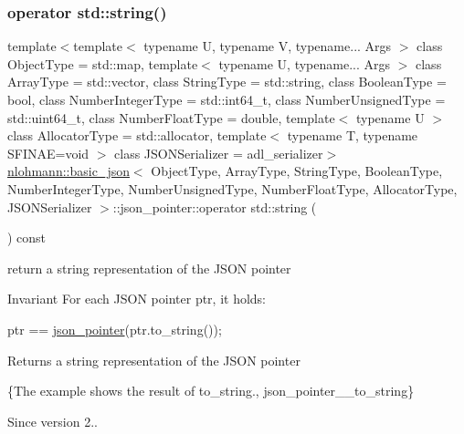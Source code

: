 \subsubsection{\texorpdfstring{operator std\+::string()}{operator std::string()}}
{\footnotesize\ttfamily template$<$template$<$ typename U, typename V, typename... Args $>$ class Object\+Type = std\+::map, template$<$ typename U, typename... Args $>$ class Array\+Type = std\+::vector, class String\+Type  = std\+::string, class Boolean\+Type  = bool, class Number\+Integer\+Type  = std\+::int64\+\_\+t, class Number\+Unsigned\+Type  = std\+::uint64\+\_\+t, class Number\+Float\+Type  = double, template$<$ typename U $>$ class Allocator\+Type = std\+::allocator, template$<$ typename T, typename S\+F\+I\+N\+A\+E=void $>$ class J\+S\+O\+N\+Serializer = adl\+\_\+serializer$>$ \\
\hyperlink{classnlohmann_1_1basic__json}{nlohmann\+::basic\+\_\+json}$<$ Object\+Type, Array\+Type, String\+Type, Boolean\+Type, Number\+Integer\+Type, Number\+Unsigned\+Type, Number\+Float\+Type, Allocator\+Type, J\+S\+O\+N\+Serializer $>$\+::json\+\_\+pointer\+::operator std\+::string (\begin{DoxyParamCaption}{ }\end{DoxyParamCaption}) const\hspace{0.3cm}{\ttfamily [inline]}}



return a string representation of the J\+S\+ON pointer 

\begin{DoxyInvariant}{Invariant}
For each J\+S\+ON pointer {\ttfamily ptr}, it holds\+: 
\begin{DoxyCode}
ptr == \hyperlink{classnlohmann_1_1basic__json_1_1json__pointer_abaa66b0d30811b8a8670a673c686b75a}{json\_pointer}(ptr.to\_string());
\end{DoxyCode}

\end{DoxyInvariant}
\begin{DoxyReturn}{Returns}
a string representation of the J\+S\+ON pointer
\end{DoxyReturn}
\{The example shows the result of {\ttfamily to\+\_\+string}., json\+\_\+pointer\+\_\+\+\_\+to\+\_\+string\}

\begin{DoxySince}{Since}
version 2.. 
\end{DoxySince}
\mbox{\label{classnlohmann_1_1basic__json_1_1json__pointer_adf63cdde9493796d8aa61bd948984b6d}} 

